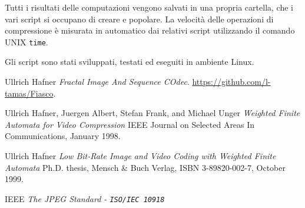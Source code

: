 \documentclass[11pt,a4paper,appendixprefix=true,numbers=noenddot]{scrreprt}
\begin{document}
Tutti i risultati delle computazioni vengono salvati in una propria cartella, che i vari script si occupano di creare e popolare. La velocità  delle operazioni di compressione è misurata in automatico dai relativi script utilizzando il comando UNIX \texttt{time}.

Gli script sono stati sviluppati, testati ed eseguiti in ambiente Linux.

\begin{thebibliography}{9}
Ullrich Hafner
\textit{Fractal Image And Sequence COdec}. 
\url{https://github.com/l-tamas/Fiasco}.
 
Ullrich Hafner, Juergen Albert, Stefan Frank, and Michael Unger
\textit{Weighted Finite Automata for Video Compression}
IEEE Journal on Selected Areas In Communications, January 1998.

Ullrich  Hafner
\textit{Low Bit-Rate Image and Video Coding with Weighted Finite Automata}
Ph.D. thesis, Mensch \& Buch Verlag, ISBN 3-89820-002-7, October 1999.

IEEE
\textit{The JPEG Standard - \texttt{ISO/IEC 10918}}

\end{thebibliography} 
\end{document}
